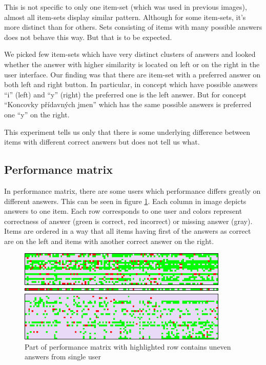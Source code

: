 \documentclass[
  digital, %
  table,   %
  nolof,     %
  nolot,     %
  nocover,
  color,
  final, %
]{fithesis3}
\begin{document}


This is not specific to only one item-set (which was used in previous images), almost all item-sets display similar pattern. Although for some item-sets, it's more distinct than for others. Sets consisting of items with many possible answers does not behave this way. But that is to be expected.

We picked few item-sets which have very distinct clusters of answers and looked whether the answer with higher similarity is located on left or on the right in the user interface. Our finding was that there are item-set with a preferred answer on both left and right button. In particular, in concept \cvicenieB{} which have possible answers ``i'' (left) and ``y'' (right) the preferred one is the left answer. But for concept ``Koncovky přídavných jmen'' which has the same possible answers is preferred one ``y'' on the right.

This experiment tells us only that there is some underlying difference between items with different correct answers but does not tell us what.


\subsection{Performance matrix}\label{performance-matrix}

In performance matrix, there are some users which performance differs greatly on different answers. This can be seen in figure \ref{fig:performance_matrix}. Each column in image depicts answers to one item. Each row corresponds to one user and colors represent correctness of answer (green is correct, red incorrect) or missing answer (gray). Items are ordered in a way that all items having first of the answers as correct are on the left and items with another correct answer on the right.

\begin{figure}
  \includegraphics[width=10cm]{img/performance_matrix}
  \caption{Part of performance matrix with highlighted row contains uneven answers from single user}
  \label{fig:performance_matrix}
\end{figure}
\end{document}
